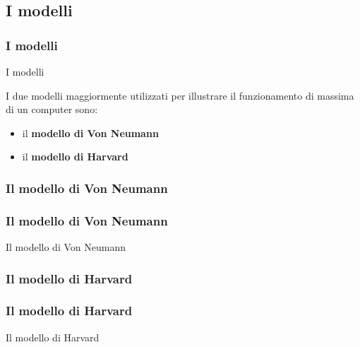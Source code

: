 \subsection[I modelli]{I modelli}
\begin{frame}
	\frametitle{I modelli}
	
	\begin{block}{I modelli}
		
		I due modelli maggiormente utilizzati per illustrare il funzionamento di massima di un computer sono:
		\begin{itemize}
			\item il \textbf{modello di Von Neumann}
			\item il \textbf{modello di Harvard}
		\end{itemize}
	\end{block}
	
	
\end{frame}

\subsubsection[Il modello di Von Neumann]{Il modello di Von Neumann}
\begin{frame}
	\frametitle{Il modello di Von Neumann}
	
	\begin{block}{Il modello di Von Neumann}
	
	\end{block}
	
	
\end{frame}


\subsubsection[Il modello di Harvard]{Il modello di Harvard}

\begin{frame}
	\frametitle{Il modello di Harvard}
	
	\begin{block}{Il modello di Harvard}
	
	\end{block}
	
	
\end{frame}
